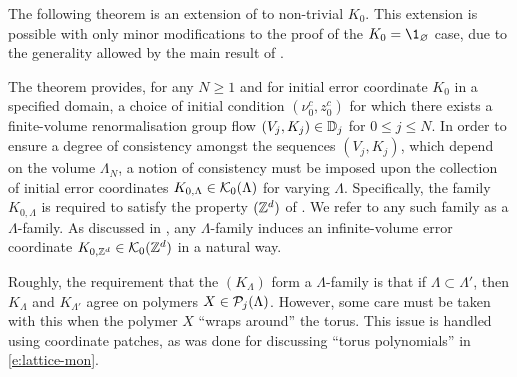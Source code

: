 The following theorem is an extension of \cite[Proposition~\ref{log-prop:flow-flow}]{BBS-saw4-log}
to non-trivial $K_0$.
This extension is possible
with only minor modifications to the proof of the $K_0 = \1_\varnothing$ case,
due to the generality allowed by the main result of \cite{BBS-rg-flow}.

The theorem provides, for any $N \ge 1$ and for initial error coordinate $K_0$
in a specified domain, a choice of initial condition $(\nu_0^c,z_0^c)$
for which there exists
a finite-volume renormalisation group flow $(V_j, K_j) \in \mathbb{D}_j$ for $0 \le j \le N$.
In order to ensure a degree of consistency amongst the sequences $(V_j, K_j)$, which depend on
the volume $\Lambda_N$, a notion of consistency must be imposed upon the collection of initial
error coordinates $K_{0,\Lambda} \in \mathcal{K}_0(\Lambda)$ for varying $\Lambda$.
Specifically, the family $K_{0,\Lambda}$ is required to satisfy the property $({ {{\mathbb Z}}^d })$ of
\cite[Definition~\ref{step-defn:KZd}]{BS-rg-step}.  We refer to any such family as a
$\Lambda$-family. As discussed in \cite[Definition~\ref{step-defn:KZd}]{BS-rg-step},
any $\Lambda$-family induces an infinite-volume error coordinate $K_{0,{ {{\mathbb Z}}^d }} \in \mathcal{K}_0({ {{\mathbb Z}}^d })$
in a natural way.

\begin{rk}
Roughly, the requirement that the $(K_\Lambda)$ form a $\Lambda$-family is that
if $\Lambda \subset \Lambda'$, then $K_\Lambda$ and $K_{\Lambda'}$ agree on polymers
$X\in\mathcal{P}_j(\Lambda)$. However, some care must be taken with this when the polymer $X$
``wraps around'' the torus. This issue is handled using coordinate patches, as was done
for discussing ``torus polynomials'' in \eqref{e:lattice-mon}.
\end{rk}

